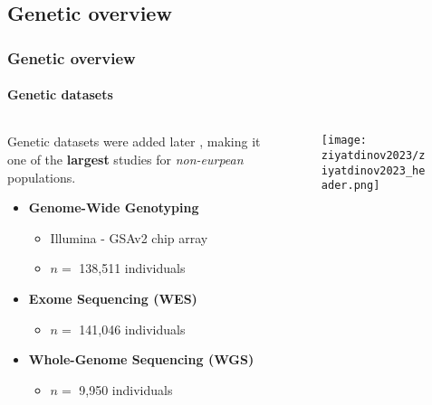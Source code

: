 \subsection{Genetic overview}
\begin{frame}
    \frametitle{Genetic overview}
    \framesubtitle{Genetic datasets}

    \begin{columns}
    \begin{column}{0.5\textwidth}

        Genetic datasets were added later \parencite{ziyatdinov2023}, making it one of the \textbf{\color{complement-1} largest} studies for \textit{non-eurpean} populations.

        \begin{itemize}[itemsep=2pt,topsep=10pt]
            \item<1-> \textbf{\color{primary-color} Genome-Wide Genotyping}
            \begin{itemize}[label=$\bullet$,noitemsep,topsep=0pt]
                \item Illumina - GSAv2 chip array
                \item $n =$ 138,511 individuals
            \end{itemize}
            \item<2-> \textbf{\color{primary-color} Exome Sequencing (WES)}
            \begin{itemize}[label=$\bullet$,noitemsep,topsep=0pt]
                \item $n =$ 141,046 individuals
            \end{itemize}
            \item<3-> \textbf{\color{primary-color} Whole-Genome Sequencing (WGS)}
            \begin{itemize}[label=$\bullet$,noitemsep,topsep=0pt]
                \item $n =$ 9,950 individuals
            \end{itemize}
        \end{itemize}
    \end{column}
    
    \begin{column}{0.5\textwidth}
        \begin{figure}[htpb]
            \centering
            \texttt{[image: ziyatdinov2023/ziyatdinov2023\_header.png]}
        \end{figure}
    \end{column}
    \end{columns}
\end{frame}

